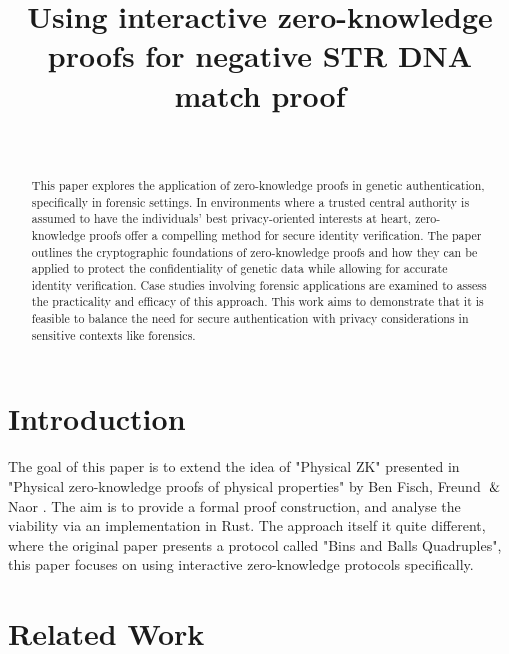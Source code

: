 \documentclass{article}
\begin{document}
\title{Using interactive zero-knowledge proofs for negative STR DNA match proof}
\author{\\
}

\maketitle

\begin{abstract}
This paper explores the application of zero-knowledge proofs in genetic authentication, specifically in forensic settings. In environments where a trusted central authority is assumed to have the individuals' best privacy-oriented interests at heart, zero-knowledge proofs offer a compelling method for secure identity verification. The paper outlines the cryptographic foundations of zero-knowledge proofs and how they can be applied to protect the confidentiality of genetic data while allowing for accurate identity verification. Case studies involving forensic applications are examined to assess the practicality and efficacy of this approach. This work aims to demonstrate that it is feasible to balance the need for secure authentication with privacy considerations in sensitive contexts like forensics.
\end{abstract}

\section{Introduction}
The goal of this paper is to extend the idea of "Physical ZK" presented in "Physical zero-knowledge proofs of physical properties" by Ben Fisch, Freund $\And$Naor \cite{fisch2014physical}. The aim is to provide a formal proof construction, and analyse the viability via an implementation in Rust. The approach itself it quite different, where the original paper presents a protocol called "Bins and Balls Quadruples", this paper focuses on using interactive zero-knowledge protocols specifically.

\section{Related Work}
\end{document}
